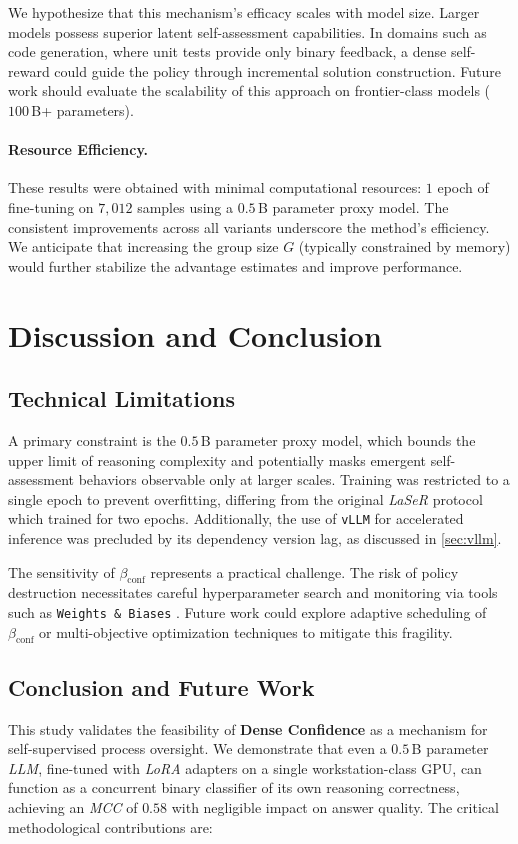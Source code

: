 \documentclass[a4paper,oneside,10pt,ngerman,english]{scrartcl}
\begin{document}
We hypothesize that this mechanism's efficacy scales with model size. Larger models possess superior latent self-assessment capabilities. In domains such as code generation, where unit tests provide only binary feedback, a dense self-reward could guide the policy through incremental solution construction. Future work should evaluate the scalability of this approach on frontier-class models ($100\,$B+ parameters).

\paragraph{Resource Efficiency.}
These results were obtained with minimal computational resources: $1$ epoch of fine-tuning on $7{,}012$ samples using a $0.5\,$B parameter proxy model. The consistent improvements across all variants underscore the method's efficiency. We anticipate that increasing the group size $G$ (typically constrained by memory) would further stabilize the advantage estimates and improve performance.

\section{Discussion and Conclusion}
\label{sec:conclusion}

\subsection{Technical Limitations}
A primary constraint is the $0.5\,$B parameter proxy model, which bounds the upper limit of reasoning complexity and potentially masks emergent self-assessment behaviors observable only at larger scales. Training was restricted to a single epoch to prevent overfitting, differing from the original \textit{LaSeR} protocol \citep{laser} which trained for two epochs. Additionally, the use of \texttt{vLLM} for accelerated inference was precluded by its dependency version lag, as discussed in \autoref{sec:vllm}.

The sensitivity of $\beta_{\mathrm{conf}}$ represents a practical challenge. The risk of policy destruction necessitates careful hyperparameter search and monitoring via tools such as \texttt{Weights \& Biases} \citep{wandb}. Future work could explore adaptive scheduling of $\beta_{\mathrm{conf}}$ or multi-objective optimization techniques to mitigate this fragility.

\subsection{Conclusion and Future Work}
This study validates the feasibility of \textbf{Dense Confidence} as a mechanism for self-supervised process oversight. We demonstrate that even a $0.5\,$B parameter \textit{LLM}, fine-tuned with \textit{LoRA} adapters on a single workstation-class GPU, can function as a concurrent binary classifier of its own reasoning correctness, achieving an \textit{MCC} of $0.58$ with negligible impact on answer quality. The critical methodological contributions are:
\end{document}
